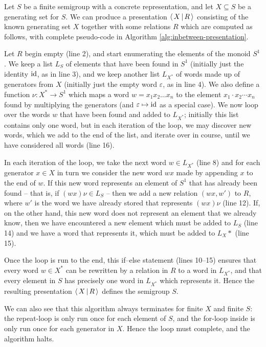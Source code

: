 \begin{method}
  \label{meth:inbetween-presentation}
  Let $S$ be a finite semigroup with a concrete representation, and let
  $X \subseteq S$ be a generating set for $S$.  We can produce a presentation
  $\left\langle \, X \, \middle| \, R \, \right\rangle$ consisting of the known generating set $X$ together with some
  relations $R$ which are computed as follows, with complete pseudo-code in
  Algorithm \ref{alg:inbetween-presentation}.

  Let $R$ begin empty (line 2), and start enumerating the elements of the monoid $S^1$.
  We keep a list $L_S$ of elements that have been found in $S^1$ (initially just
  the identity $\operatorname{id}$, as in line 3), and we keep another
  list $L_{X^*}$ of words made up of generators from $X$ (initially just the
  empty word $\varepsilon$, as in line 4).  We also define a
  function $\nu : X^* \to S^1$ which maps a word $w=x_1x_2\ldots x_n$ to the
  element $x_1\cdot x_2\cdots x_n$ found by multiplying the generators (and
  $\varepsilon \mapsto \operatorname{id}$ as a special case).
  We now loop over the words $w$ that have been found and added to $L_{X^*}$;
  initially this list contains only one word, but in each iteration of the loop,
  we may discover new words, which we add to the end of the list, and iterate
  over in course, until we have considered all words (line 16).

  In each iteration of the loop, we take the next word $w \in L_{X^*}$ (line 8)
  and for each generator $x \in X$ in turn we consider the new word $wx$ made by
  appending $x$ to the end of $w$.  If this new word represents an element of
  $S^1$ that has already been found -- that is, if $(wx)\nu \in L_S$ -- then we
  add a new relation $(wx, w')$ to $R$, where $w'$ is the word we have already
  stored that represents $(wx)\nu$ (line 12).  If, on the other hand, this new
  word does not represent an element that we already know, then we have
  encountered a new element which must be added to $L_S$ (line 14) and we have a
  word that represents it, which must be added to $L_X*$ (line 15).

  Once the loop is run to the end, this if--else statement (lines 10--15)
  ensures that every word $w \in X^*$ can be rewritten by a relation in $R$ to a
  word in $L_{X^*}$, and that every element in $S$ has precisely one word in
  $L_{X^*}$ which represents it.
  Hence the resulting presentation $\left\langle \, X \, \middle| \, R \, \right\rangle$ defines the semigroup $S$.

  We can also see that this algorithm always terminates for finite $X$ and
  finite $S$: the repeat-loop is only run once for each element of $S$, and the
  for-loop inside is only run once for each generator in $X$.  Hence the loop
  must complete, and the algorithm halts.
\end{method}

